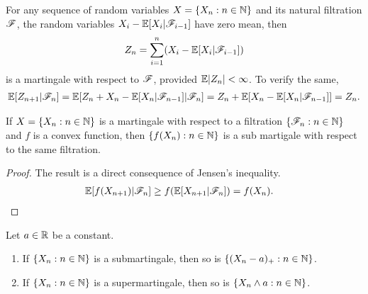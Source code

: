 \documentclass[a4paper,10pt,english]{article}
\begin{document}
\begin{shaded*}
\begin{exmp*}
For any sequence of random variables $X = \{X_n: n \in \mathbb{N}\}$ and its natural filtration $\mathscr{F}$, 
the random variables $X_i-\mathbb{E}[X_i|\mathscr{F}_{i-1}]$ have zero mean, then 
\begin{align*}
Z_n =\sum_{i=1}^n (X_i -\mathbb{E}[X_i|\mathscr{F}_{i-1}])
\end{align*}
is a martingale with respect to $\mathscr{F}$, provided $\mathbb{E} |Z_n|< \infty$.  
To verify the same, 
\begin{align*}
\mathbb{E}[Z_{n+1}|\mathscr{F}_n]&= \mathbb{E}[Z_n+X_n-\mathbb{E}[X_n|\mathscr{F}_{n-1}]|\mathscr{F}_n] = Z_n+\mathbb{E}[X_n-\mathbb{E}[X_n|\mathscr{F}_{n-1}]]=Z_n.\\
\end{align*}
\end{exmp*}
\end{shaded*}

\begin{lem}
\label{ConvexFuncSubmart}
If $X = \{X_n: n \in \mathbb{N}\}$ is a martingale with respect to a filtration $\{\mathscr{F}_n: n \in \mathbb{N}\}$ and $f$ is a convex function, 
then $\{f(X_n): n \in \mathbb{N}\}$ is a sub martigale with respect to the same filtration.
\end{lem}
\begin{proof}
The result is a direct consequence of Jensen's inequality.
\begin{align*}
\mathbb{E}[f(X_{n+1})|\mathscr{F}_n] &\geq f(\mathbb{E}[X_{n+1}|\mathscr{F}_n])=f(X_n).
\end{align*}
\end{proof}

\begin{cor} 
Let $a \in \mathbb{R}$ be a constant. 
\begin{enumerate}[i\_]
\item If $\{X_n : n \in \mathbb{N}\}$ is a submartingale, then so is $\{(X_n - a)_+: n \in \mathbb{N}\}$.  
\item If $\{X_n : n \in \mathbb{N}\}$ is a supermartingale, then so is $\{X_n \wedge a: n \in \mathbb{N}\}$. 
\end{enumerate}
\end{cor}
\end{document}
